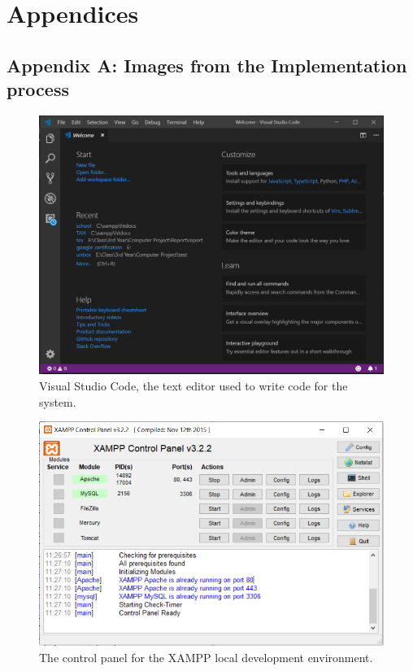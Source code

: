 \chapter{Appendices}
\section{Appendix A: Images from the Implementation process}

\begin{figure}[H]
\includegraphics[scale=0.4]{images/vscode.png}
\caption{Visual Studio Code, the text editor used to write code for the system.}
\end{figure}

\begin{figure}[H]
\includegraphics[scale=0.5]{images/XAMPP_cp.png}
\caption{The control panel for the XAMPP local development environment.}
\end{figure}

